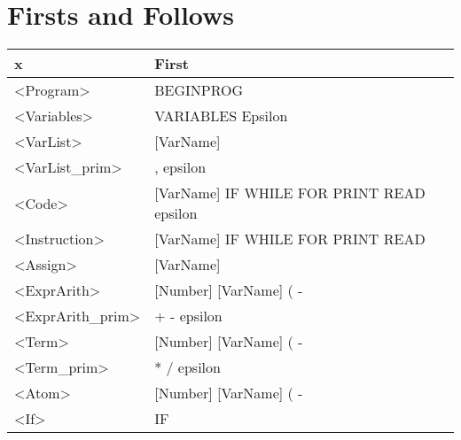 \documentclass[12pt]{article}
\begin{document}
\section{Firsts and Follows}
\begin{table}[H]
	\begin{tabular}{|l|l|}
		\hline
		x                                        & First                                                                           \\ \hline
		\textless{}Program\textgreater{}         & BEGINPROG                                                                       \\ \hline
		\textless{}Variables\textgreater{}       & VARIABLES    Epsilon                                                            \\ \hline
		\textless{}VarList\textgreater{}         & {[}VarName{]}                                                                   \\ \hline
		\textless{}VarList\_prim\textgreater{}   & , epsilon                                                                       \\ \hline
		\textless{}Code\textgreater{}            & {[}VarName{]} IF WHILE FOR PRINT READ epsilon                                   \\ \hline
		\textless{}Instruction\textgreater{}     & {[}VarName{]} IF WHILE FOR PRINT READ                                           \\ \hline
		\textless{}Assign\textgreater{}          & {[}VarName{]}                                                                   \\ \hline
		\textless{}ExprArith\textgreater{}       & {[}Number{]} {[}VarName{]} ( -                                                  \\ \hline
		\textless{}ExprArith\_prim\textgreater{} & + - epsilon                                                                     \\ \hline
		\textless{}Term\textgreater{}            & {[}Number{]} {[}VarName{]} ( -                                                  \\ \hline
		\textless{}Term\_prim\textgreater{}      & * / epsilon                                                                     \\ \hline
		\textless{}Atom\textgreater{}            & {[}Number{]} {[}VarName{]} ( -                                                  \\ \hline
		\textless{}If\textgreater{}              & IF                                                                              \\ \hline

\end{tabular}
\end{table}
\end{document}
